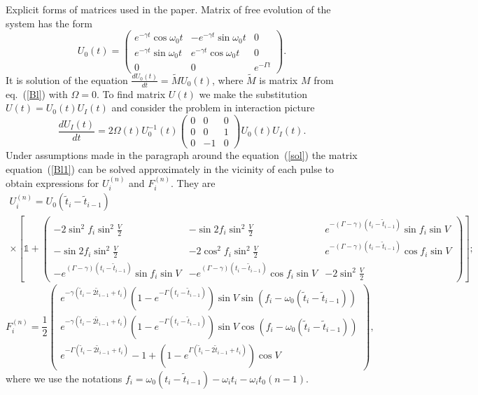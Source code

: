 \documentclass[prb,twocolumn,showpacs,epsfig,epsf]{revtex4}
\newcommand{\1}{\mathds{1}}
\begin{document}
\begin{widetext}



Explicit forms of matrices used in the paper. Matrix of free evolution of the system has the form
\begin{equation}\label{U0}
U_0(t)=\left(\begin{array}{ccc}
e^{-\gamma t}\cos\omega_0 t&-e^{-\gamma t}\sin\omega_0 t&0\\
e^{-\gamma t}\sin\omega_0 t&e^{-\gamma t}\cos\omega_0 t&0\\
0&0&e^{-\Gamma t}
\end{array}\right).
\end{equation}
It is solution of the equation $\frac{d U_0(t)}{dt}=\tilde M U_0(t)$, where $\tilde M$ is matrix $M$ from eq.~(\ref{Bl}) with $\Omega=0$. To find matrix $U(t)$ we make the substitution $U(t)=U_0(t)U_I(t)$ and consider the problem in interaction picture~\cite{PY1990}
\begin{equation}\label{Bl1}
\frac{dU_I(t)}{dt}= 2\Omega(t)U_0^{-1}(t)\left(\begin{array}{ccc}
 0&0&0\\
 0&0&1\\
 0&-1&0
\end{array}\right)U_0(t)U_I(t).
\end{equation}
Under assumptions made in the paragraph around the equation~(\ref{sol}) the matrix equation~(\ref{Bl1}) can be solved approximately in the vicinity of each pulse to obtain expressions for $U^{(n)}_i$ and  $F^{(n)}_i$. They are
\begin{multline}\label{Un}
U^{(n)}_i=U_0(\tilde t_i-\tilde t_{i-1})\\\times\left[\1+\left(\begin{array}{ccc}
-2\sin^2 f_i\sin^2 \frac{V}{2}&- \sin 2 f_i\sin^2\frac{V}{2}& e^{-(\Gamma-\gamma )(t_i-\tilde t_{i-1})}\sin f_i\sin V\\
- \sin 2 f_i\sin^2\frac{V}{2}&-2\cos^2 f_i\sin^2\frac{V }{2}& e^{-(\Gamma-\gamma )(t_i-\tilde t_{i-1})}\cos f_i\sin V\\
-e^{(\Gamma-\gamma )(t_i-\tilde t_{i-1})}\sin f_i\sin V&-e^{(\Gamma-\gamma )(t_i-\tilde t_{i-1})}\cos f_i\sin V&-2\sin^2\frac{V}{2}
\end{array}\right)\right];
\end{multline}
\begin{equation}\label{Fn}
F^{(n)}_i=\frac{1}{2}\left(\begin{array}{c}
e^{-\gamma (\tilde t_i-2\tilde t_{i-1}+t_i)}(1-e^{-\Gamma (t_i-\tilde t_{i-1})})\sin V \sin(f_i-\omega_0 (\tilde t_{i}-\tilde t_{i-1}))\\
e^{-\gamma (\tilde t_i-2\tilde t_{i-1}+t_i)}(1-e^{-\Gamma (t_i-\tilde t_{i-1})})\sin V \cos(f_i-\omega_0 (\tilde t_{i}-\tilde t_{i-1}))\\
e^{-\Gamma (\tilde t_i-2\tilde t_{i-1}+t_i)}-1+ (1-e^{\Gamma (\tilde t_i-2\tilde t_{i-1}+t_i)})\cos V
\end{array}\right),
\end{equation}
where we use the notations
$ f_i=\omega_0(t_i-\tilde t_{i-1})-\omega_i t_i-\omega_i t_0(n-1)$.


\end{widetext}
\end{document}
